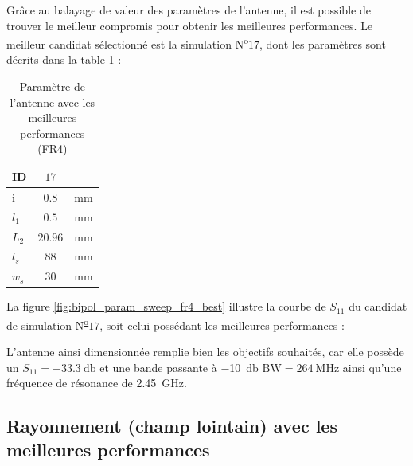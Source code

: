 \documentclass[Deriaz_Traiber_Labo02]{subfiles}
\begin{document}
Grâce au balayage de valeur des paramètres de l'antenne, il est possible de trouver le meilleur compromis pour obtenir les meilleures performances. Le meilleur candidat sélectionné est la simulation N\textsuperscript{\underline{o}}$17$, dont les paramètres sont décrits dans la table \ref{tab:best-perf-fr4} :

\begin{table}[H]
\centering
\begin{tabular}{||l c c||}    \hline
    ID      &    $17$     &  $-$ \\\hline
     i       &   $0.8$    &  \si{\milli\meter}\\
    $l_1$     &  $0.5$   &   \si{\milli\meter}\\
    $L_2$     & $20.96$  &  \si{\milli\meter}\\
    $l_s$      & $88$     &  \si{\milli\meter}\\
    $w_s$      & $30$     &  \si{\milli\meter}\\\hline
\end{tabular}
     \caption{Paramètre de l'antenne avec les meilleures performances (FR4)}
     \label{tab:best-perf-fr4}
\end{table}

\pagebreak

La figure \ref{fig:bipol_param_sweep_fr4_best} illustre la courbe de $S_{11}$ du candidat de simulation N\textsuperscript{\underline{o}}$17$, soit celui possédant les meilleures performances :


L'antenne ainsi dimensionnée remplie bien les objectifs souhaités, car elle possède un $S_{11} = \SI{-33.3}{\decibel}$ et une bande passante à \SI{-10}{\decibel} $\text{BW} = \SI{264}{\mega\hertz}$ ainsi qu'une fréquence de résonance de \SI{2.45}{\giga\hertz}.

\subsection{Rayonnement (champ lointain) avec les meilleures performances}

\end{document}
